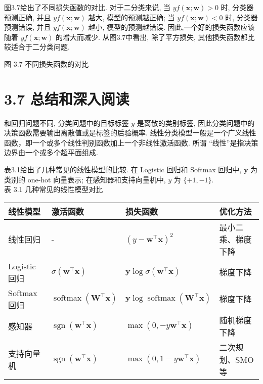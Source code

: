 \documentclass[10pt]{article}
\begin{document}
图3.7给出了不同损失函数的对比. 对于二分类来说, 当 $y f(\boldsymbol{x} ; \boldsymbol{w})>0$ 时, 分类器预测正确, 并且 $y f(\boldsymbol{x} ; \boldsymbol{w})$ 越大, 模型的预测越正确; 当 $y f(\boldsymbol{x} ; \boldsymbol{w})<0$ 时, 分类器预测错误, 并且 $y f(\boldsymbol{x} ; \boldsymbol{w})$ 越小, 模型的预测越错误. 因此,一个好的损失函数应该随着 $y f(\boldsymbol{x} ; \boldsymbol{w})$ 的增大而减少. 从图3.7中看出, 除了平方损失, 其他损失函数都比较适合于二分类问题.



图 3.7 不同损失函数的对比

\section*{3.7 总结和深入阅读}
和回归问题不同, 分类问题中的目标标签 $y$ 是离散的类别标签, 因此分类问题中的决策函数需要输出离散值或是标签的后验概率. 线性分类模型一般是一个广义线性函数，即一个或多个线性判别函数加上一个非线性激活函数. 所谓 “线性”是指决策边界由一个或多个超平面组成.

表3.1给出了几种常见的线性模型的比较. 在 Logistic 回归和 Softmax 回归中, $\boldsymbol{y}$ 为类别的 one-hot 向量表示; 在感知器和支持向量机中, $y$ 为 $\{+1,-1\}$.\\
表 3.1 几种常见的线性模型对比

\begin{center}
\begin{tabular}{llll}
\hline
线性模型 & 激活函数 & 损失函数 & 优化方法 \\
\hline
线性回归 & - & $\left(y-\boldsymbol{w}^{\top} \boldsymbol{x}\right)^{2}$ & 最小二乘、梯度下降 \\
Logistic 回归 & $\sigma\left(\boldsymbol{w}^{\top} \boldsymbol{x}\right)$ & $\boldsymbol{y} \log \sigma\left(\boldsymbol{w}^{\top} \boldsymbol{x}\right)$ & 梯度下降 \\
Softmax 回归 & $\operatorname{softmax}\left(\boldsymbol{W}^{\top} \boldsymbol{x}\right)$ & $\boldsymbol{y} \log \operatorname{softmax}\left(\boldsymbol{W}^{\top} \boldsymbol{x}\right)$ & 梯度下降 \\
感知器 & $\operatorname{sgn}\left(\boldsymbol{w}^{\top} \boldsymbol{x}\right)$ & $\max \left(0,-y \boldsymbol{w}^{\top} \boldsymbol{x}\right)$ & 随机梯度下降 \\
支持向量机 & $\operatorname{sgn}\left(\boldsymbol{w}^{\top} \boldsymbol{x}\right)$ & $\max \left(0,1-y \boldsymbol{w}^{\top} \boldsymbol{x}\right)$ & 二次规划、SMO 等 \\
\hline
\end{tabular}
\end{center}
\end{document}
